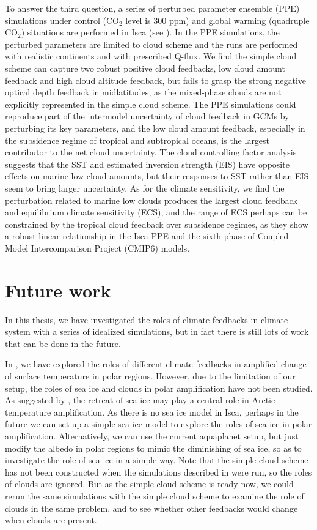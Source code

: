 To answer the third question, a series of perturbed parameter ensemble (PPE) simulations under control (CO$_2$ level is 300 ppm) and global warming (quadruple CO$_2$) situations are performed in Isca (see ). In the PPE simulations, the perturbed parameters are limited to cloud scheme and the runs are performed with realistic continents and with prescribed Q-flux. We find the simple cloud scheme can capture two robust positive cloud feedbacks, low cloud amount feedback and high cloud altitude feedback, but fails to grasp the strong negative optical depth feedback in midlatitudes, as the mixed-phase clouds are not explicitly represented in the simple cloud scheme. The PPE simulations could reproduce part of the intermodel uncertainty of cloud feedback in GCMs by perturbing its key parameters, and the low cloud amount feedback, especially in the subsidence regime of tropical and subtropical oceans, is the largest contributor to the net cloud uncertainty. The cloud controlling factor analysis suggests that the SST and estimated inversion strength (EIS) have opposite effects on marine low cloud amounts, but their responses to SST rather than EIS seem to bring larger uncertainty. As for the climate sensitivity, we find the perturbation related to marine low clouds produces the largest cloud feedback and equilibrium climate sensitivity (ECS), and the range of ECS perhaps can be constrained by the tropical cloud feedback over subsidence regimes, as they show a robust linear relationship in the Isca PPE and the sixth phase of Coupled Model Intercomparison Project (CMIP6) models.

\section{Future work}

In this thesis, we have investigated the
roles of climate feedbacks in climate system with a series of idealized simulations, but in fact there is still lots of work that can be done in the future.

In , we have explored the roles of different climate feedbacks in amplified change of surface temperature in polar regions. However, due to the limitation of our setup, the roles of sea ice and clouds in polar amplification have not been studied. As suggested by \cite{Screen2010}, the retreat of sea ice may play a central role in Arctic temperature amplification. As there is no sea ice model in Isca, perhaps in the future we can set up a simple sea ice model to explore the roles of sea ice in polar amplification. Alternatively, we can use the current aquaplanet setup, but just modify the albedo in polar regions to mimic the diminishing of sea ice, so as to investigate the role of sea ice in a simple way. Note that the simple cloud scheme has not been constructed when the simulations described in  were run, so the roles of clouds are ignored. But as the simple cloud scheme is ready now, we could rerun the same simulations with the simple cloud scheme to examine the role of clouds in the same problem, and to see whether other feedbacks would change when clouds are present.

